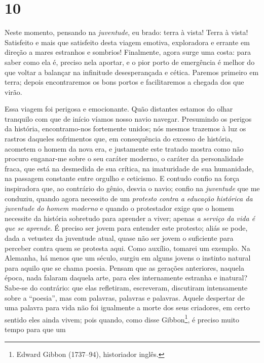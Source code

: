 \chapter{10}\label{capuxedtulo-10}

Neste momento, pensando na \emph{juventude}, eu brado: terra à
    vista! Terra à vista! Satisfeito e mais que satisfeito desta viagem
    emotiva, exploradora e errante em direção a mares estranhos e
    sombrios! Finalmente, agora surge uma costa: para saber como ela é,
    preciso nela aportar, e o pior porto de emergência é melhor do que
    voltar a balançar na infinitude desesperançada e cética. Paremos
    primeiro em terra; depois encontraremos os bons portos e
    facilitaremos a chegada dos que virão.

    Essa viagem foi perigosa e emocionante. Quão distantes estamos do
    olhar tranquilo com que de início víamos nosso navio navegar.
    Presumindo os perigos da história, encontramo-nos fortemente unidos;
    nós mesmos trazemos à luz os rastros daqueles sofrimentos que, em
    consequência do excesso de história, acometem o homem da nova era, e
    justamente este tratado mostra como não procuro enganar-me sobre o
    seu caráter moderno, o caráter da personalidade fraca, que está na
    desmedida de sua crítica, na imaturidade de sua humanidade, na
    passagem constante entre orgulho e ceticismo. E contudo confio na
    força inspiradora que, ao contrário do gênio, desvia o navio; confio
    na \emph{juventude} que me conduziu, quando agora necessito de um
    \emph{protesto contra a educação histórica da juventude do homem
    moderno} e quando o protestador exige que o homem necessite da
    história sobretudo para aprender a viver; apenas \emph{a serviço da
    vida é que se aprende}. É preciso ser jovem para entender este
    protesto; aliás se pode, dada a vetustez da juventude atual, quase
    não ser jovem o suficiente para perceber contra quem se protesta
    aqui. Como auxílio, tomarei um exemplo. Na Alemanha, há menos que um
    século, surgiu em alguns jovens o instinto natural para aquilo que se
    chama poesia. Pensam que as gerações anteriores, naquela época, nada
    falaram daquela arte, para eles internamente estranha e inatural?
    Sabe-se do contrário: que elas refletiram, escreveram, discutiram
    intensamente sobre a ``poesia'', mas com palavras, palavras e
    palavras. Aquele despertar de uma palavra para vida não foi
    igualmente a morte dos seus criadores, em certo sentido eles ainda
    vivem; pois quando, como disse Gibbon\footnote{Edward Gibbon
      (1737--94), historiador inglês.}, é preciso muito tempo para que um
